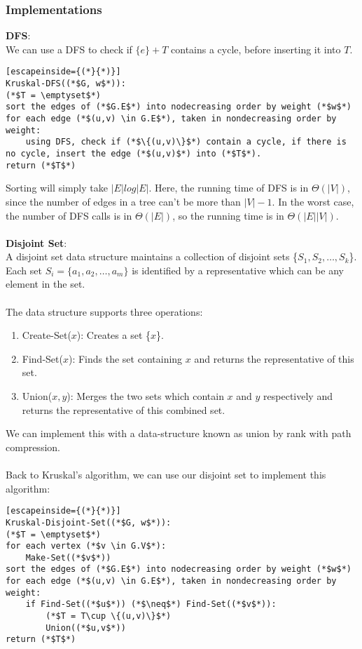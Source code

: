 \documentclass[a4paper]{article}
\begin{document}
\subsubsection{Implementations}
\textbf{DFS}:\\
We can use a DFS to check if $\{e\} + T$ contains a cycle, before inserting it into $T$.
\begin{lstlisting}[escapeinside={(*}{*)}]
Kruskal-DFS((*$G, w$*)):
(*$T = \emptyset$*)
sort the edges of (*$G.E$*) into nodecreasing order by weight (*$w$*)
for each edge (*$(u,v) \in G.E$*), taken in nondecreasing order by weight:
	using DFS, check if (*$\{(u,v)\}$*) contain a cycle, if there is no cycle, insert the edge (*$(u,v)$*) into (*$T$*).
return (*$T$*)
\end{lstlisting}
Sorting will simply take $|E| log |E|$. Here, the running time of DFS is in $\Theta(|V|)$, since the number of edges in a tree can't be more than $|V| - 1$. In the worst case, the number of DFS calls is in $\Theta(|E|)$, so the running time is in $\Theta(|E||V|)$.\\\\
\textbf{Disjoint Set}:\\
A disjoint set data structure maintains a collection of disjoint sets \{$S_1, S_2, \dots, S_k$\}. Each set $S_i = \{a_1,a_2,\dots,a_m\}$ is identified by a representative which can be any element in the set.\\\\
The data structure supports three operations:
\begin{enumerate}
	\item Create-Set($x$): Creates a set \{$x$\}.
	\item Find-Set($x$): Finds the set containing $x$ and returns the representative of this set.
	\item Union($x, y$): Merges the two sets which contain $x$ and $y$ respectively and returns the representative of this combined set.
\end{enumerate}
We can implement this with a data-structure known as union by rank with path compression.\\\\
Back to Kruskal's algorithm, we can use our disjoint set to implement this algorithm:
\begin{lstlisting}[escapeinside={(*}{*)}]
Kruskal-Disjoint-Set((*$G, w$*)):
(*$T = \emptyset$*)
for each vertex (*$v \in G.V$*):
	Make-Set((*$v$*))
sort the edges of (*$G.E$*) into nodecreasing order by weight (*$w$*)
for each edge (*$(u,v) \in G.E$*), taken in nondecreasing order by weight:
	if Find-Set((*$u$*)) (*$\neq$*) Find-Set((*$v$*)):
		(*$T = T\cup \{(u,v)\}$*)
		Union((*$u,v$*))
return (*$T$*)
\end{lstlisting}
\end{document}

